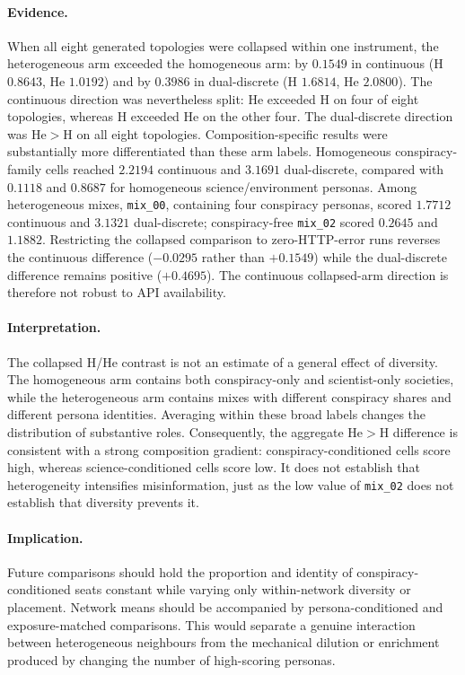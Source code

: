 \paragraph{Evidence.}
When all eight generated topologies were collapsed within one instrument, the
heterogeneous arm exceeded the homogeneous arm: by $0.1549$ in continuous
\MI{} (H $0.8643$, He $1.0192$) and by $0.3986$ in dual-discrete \MI{}
(H $1.6814$, He $2.0800$).  The continuous direction was nevertheless split:
He exceeded H on four of eight topologies, whereas H exceeded He on the other
four.  The dual-discrete direction was He$>$H on all eight topologies.
Composition-specific results were substantially more differentiated than
these arm labels.  Homogeneous conspiracy-family cells reached $2.2194$
continuous and $3.1691$ dual-discrete, compared with $0.1118$ and $0.8687$
for homogeneous science/environment personas.  Among heterogeneous mixes,
\texttt{mix\_00}, containing four conspiracy personas, scored $1.7712$
continuous and $3.1321$ dual-discrete; conspiracy-free \texttt{mix\_02}
scored $0.2645$ and $1.1882$.
Restricting the collapsed comparison to zero-HTTP-error runs reverses the
continuous difference ($-0.0295$ rather than $+0.1549$) while the
dual-discrete difference remains positive ($+0.4695$). The continuous
collapsed-arm direction is therefore not robust to API availability.

\paragraph{Interpretation.}
The collapsed H/He contrast is not an estimate of a general effect of
diversity.  The homogeneous arm contains both conspiracy-only and
scientist-only societies, while the heterogeneous arm contains mixes with
different conspiracy shares and different persona identities.  Averaging
within these broad labels changes the distribution of substantive roles.
Consequently, the aggregate He$>$H difference is consistent with a strong
composition gradient: conspiracy-conditioned cells score high, whereas
science-conditioned cells score low.  It does not establish that
heterogeneity intensifies misinformation, just as the low value of
\texttt{mix\_02} does not establish that diversity prevents it.

\paragraph{Implication.}
Future comparisons should hold the proportion and identity of
conspiracy-conditioned seats constant while varying only within-network
diversity or placement.  Network means should be accompanied by
persona-conditioned \MPR{} and exposure-matched comparisons.  This would
separate a genuine interaction between heterogeneous neighbours from the
mechanical dilution or enrichment produced by changing the number of
high-scoring personas.

